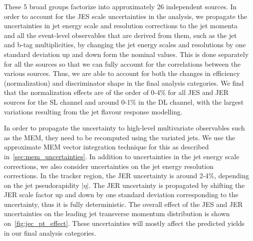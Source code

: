 These 5 broad groups factorize into approximately 26 independent sources. In order to account for the JES scale uncertainties in the analysis, we propagate the uncertainties in jet energy scale and resolution corrections to the jet momenta and all the event-level observables that are derived from them, such as the jet and b-tag multiplicities, by changing the jet energy scales and resolutions by one standard deviation up and down form the nominal values. This is done separately for all the sources so that we can fully account for the correlations between the various sources. Thus, we are able to account for both the changes in efficiency (normalization) and discriminator shape in the final analysis categories. We find that the normalization effects are of the order of 0-4\% for all JES and JER sources for the SL channel and around 0-1\% in the DL channel, with the largest variations resulting from the jet flavour response modelling.

In order to propagate the uncertainty to high-level multivariate observables such as the MEM, they need to be recomputed using the variated jets. We use the approximate MEM vector integration technique for this as described in~\cref{sec:mem_uncertainties}. In addition to uncertainties in the jet energy scale corrections, we also consider uncertainties on the jet energy resolution corrections. In the tracker region, the JER uncertainty is around 2-4\%, depending on the jet pseudorapidity $|\eta|$. The JER uncertainty is propagated by shifting the JER scale factor up and down by one standard deviation corresponding to the uncertainty, thus it is fully deterministic. The overall effect of the JES and JER uncertainties on the leading jet transverse momentum distribution is shown on~\cref{fig:jec_pt_effect}. These uncertainties will mostly affect the predicted yields in our final analysis categories.

